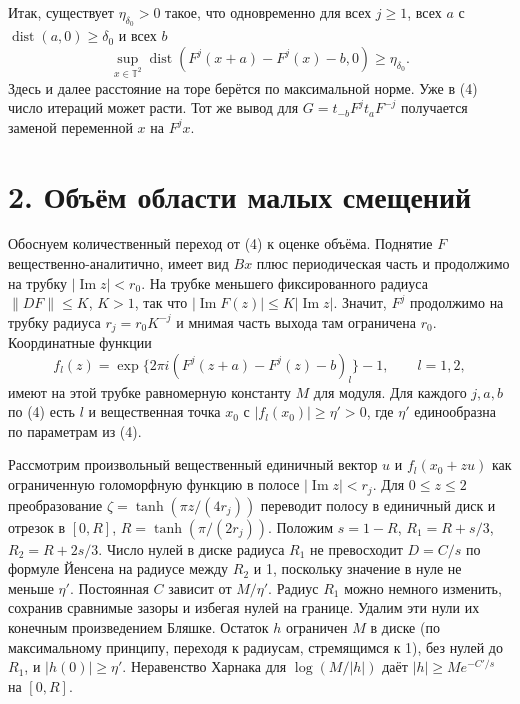 \documentclass[11pt,a4paper]{article}
\newcommand{\sect}[1]{\section*{\sffamily\color{ink}#1}}
\newcommand{\T}{\mathbb T}
\begin{document}
Итак, существует $\eta_{\delta_0}>0$ такое, что одновременно для всех $j\ge1$, всех $a$ с $\operatorname{dist}(a,0)\ge\delta_0$ и всех $b$
\[
   \sup_{x\in\T^2}\operatorname{dist}
             (F^j(x+a)-F^j(x)-b,0)\ge\eta_{\delta_0}.                 \tag{4}
\]
Здесь и далее расстояние на торе берётся по максимальной норме. Уже в (4) число итераций может расти. Тот же вывод для $G=t_{-b}F^jt_a F^{-j}$ получается заменой переменной $x$ на $F^jx$.
\newpage
\sect{2. Объём области малых смещений}
Обоснуем количественный переход от (4) к оценке объёма. Поднятие $F$ вещественно-аналитично, имеет вид $Bx$ плюс периодическая часть и продолжимо на трубку $|\operatorname{Im}z|<r_0$. На трубке меньшего фиксированного радиуса $\|DF\|\le K$, $K>1$, так что $|\operatorname{Im}F(z)|\le K|\operatorname{Im}z|$. Значит, $F^j$ продолжимо на трубку радиуса $r_j=r_0K^{-j}$ и мнимая часть выхода там ограничена $r_0$. Координатные функции
\[
 f_l(z)=\exp\{2\pi i(F^j(z+a)-F^j(z)-b)_l\}-1,\qquad l=1,2,
\]
имеют на этой трубке равномерную константу $M$ для модуля. Для каждого $j,a,b$ по (4) есть $l$ и вещественная точка $x_0$ с $|f_l(x_0)|\ge\eta'>0$, где $\eta'$ единообразна по параметрам из (4).

Рассмотрим произвольный вещественный единичный вектор $u$ и $f_l(x_0+zu)$ как ограниченную голоморфную функцию в полосе $|\operatorname{Im}z|<r_j$. Для $0\le z\le2$ преобразование $\zeta=\tanh(\pi z/(4r_j))$ переводит полосу в единичный диск и отрезок в $[0,R]$, $R=\tanh(\pi/(2r_j))$. Положим $s=1-R$, $R_1=R+s/3$, $R_2=R+2s/3$. Число нулей в диске радиуса $R_1$ не превосходит $D=C/s$ по формуле Йенсена на радиусе между $R_2$ и 1, поскольку значение в нуле не меньше $\eta'$. Постоянная $C$ зависит от $M/\eta'$. Радиус $R_1$ можно немного изменить, сохранив сравнимые зазоры и избегая нулей на границе. Удалим эти нули их конечным произведением Бляшке. Остаток $h$ ограничен $M$ в диске (по максимальному принципу, переходя к радиусам, стремящимся к 1), без нулей до $R_1$, и $|h(0)|\ge\eta'$. Неравенство Харнака для $\log(M/|h|)$ даёт $|h|\ge M e^{-C'/s}$ на $[0,R]$.
\end{document}
